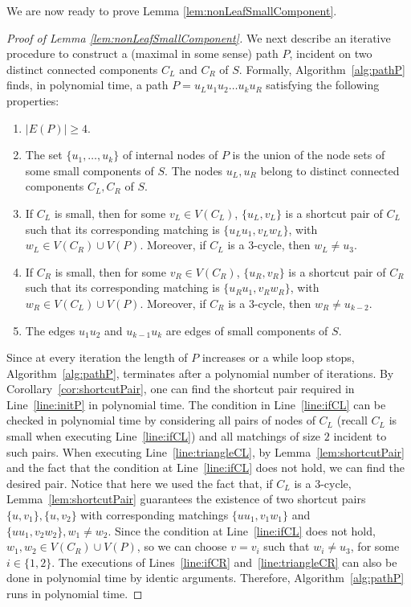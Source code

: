\documentclass{article}
\begin{document}
%
We are now ready to prove Lemma \ref{lem:nonLeafSmallComponent}.
\begin{proof}[Proof of Lemma \ref{lem:nonLeafSmallComponent}]
    We next describe an iterative procedure to construct a (maximal in some sense) path $P$, incident on two distinct connected components $C_L$ and $C_R$ of $S$. Formally, Algorithm~\ref{alg:pathP} finds, in polynomial time, a path $P = u_Lu_1u_2\dots u_ku_R$ satisfying the following properties:

    \begin{enumerate}
        \item $|E(P)|\geq 4$.\label{prp:pathLength}
        \item The set $\{u_1, \dots, u_k\}$ of internal nodes of $P$ is the union of the node sets of some small components of $S$. The nodes $u_L, u_R$ belong to distinct connected components $C_L, C_R$ of $S$.\label{prp:internalNodesP}
        \item If $C_L$ is small, then for some $v_L\in V(C_L)$, $\{u_L, v_L\}$ is a shortcut pair of $C_L$ such that its corresponding matching is $\{u_Lu_1, v_Lw_L\}$, with $w_L\in V(C_R)\cup V(P)$. Moreover, if $C_L$ is a $3$-cycle, then $w_L\neq u_3$.\label{prp:cl}
        \item If $C_R$ is small, then for some $v_R\in V(C_R)$, $\{u_R, v_R\}$ is a shortcut pair of $C_R$ such that its corresponding matching is $\{u_Ru_1, v_Rw_R\}$, with $w_R\in V(C_L)\cup V(P)$. Moreover, if $C_R$ is a $3$-cycle, then $w_R\neq u_{k-2}$.\label{prp:cr}
        \item The edges $u_1u_2$ and $u_{k-1}u_k$ are edges of small components of $S$.\label{prp:u2}
    \end{enumerate}

    Since at every iteration the length of $P$ increases or a while loop stops, Algorithm~\ref{alg:pathP}, terminates after a polynomial number of iterations. By Corollary~\ref{cor:shortcutPair}, one can find the shortcut pair required in Line~\ref{line:initP} in polynomial time. The condition in Line~\ref{line:ifCL} can be checked in polynomial time by considering all pairs of nodes of $C_L$ (recall $C_L$ is small when executing Line~\ref{line:ifCL}) and all matchings of size $2$ incident to such pairs. When executing Line~\ref{line:triangleCL}, by Lemma~\ref{lem:shortcutPair} and the fact that the condition at Line~\ref{line:ifCL} does not hold, we can find the desired pair. Notice that here we used the fact that, if $C_L$ is a $3$-cycle, Lemma~\ref{lem:shortcutPair} guarantees the existence of two shortcut pairs $\{u, v_1\}, \{u, v_2\}$ with corresponding matchings $\{uu_1, v_1w_1\}$ and $\{uu_1, v_2w_2\}, w_1\neq w_2$. Since the condition at Line~\ref{line:ifCL} does not hold, $w_1, w_2\in V(C_R)\cup V(P)$, so we can choose $v = v_i$ such that $w_i \neq u_3$, for some $i\in\{1, 2\}$. The executions of Lines~\ref{line:ifCR} and~\ref{line:triangleCR} can also be done in polynomial time by identic arguments. Therefore, Algorithm~\ref{alg:pathP} runs in polynomial time.


\end{proof}
\end{document}

